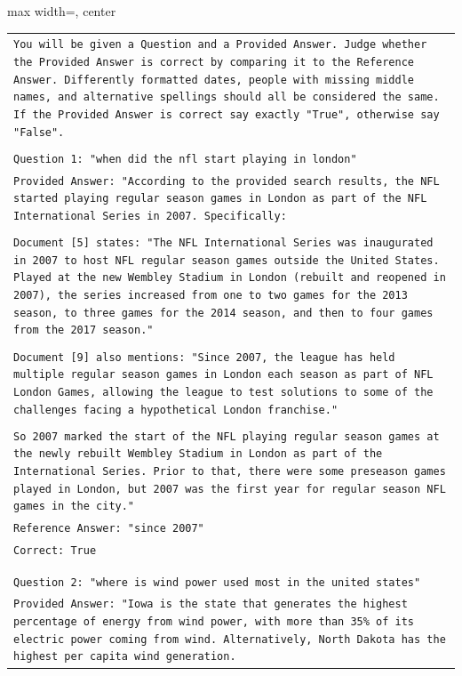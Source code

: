 \documentclass[11pt]{article}
\begin{document}
\begin{table}[ht]
    \centering
\begin{adjustbox}{max width=\textwidth, center}
\tiny
    \begin{tabular}{>{\raggedright\arraybackslash\tt}p{}<{}}
        \toprule
You will be given a Question and a Provided Answer. Judge whether the Provided Answer is correct by comparing it to the Reference Answer. Differently formatted dates, people with missing middle names, and alternative spellings should all be considered the same. If the Provided Answer is correct say exactly "True", otherwise say "False".\\
\\
Question 1: "when did the nfl start playing in london"\\
Provided Answer: "According to the provided search results, the NFL started playing regular season games in London as part of the NFL International Series in 2007. Specifically:\\
\\
Document [5] states: "The NFL International Series was inaugurated in 2007 to host NFL regular season games outside the United States. Played at the new Wembley Stadium in London (rebuilt and reopened in 2007), the series increased from one to two games for the 2013 season, to three games for the 2014 season, and then to four games from the 2017 season."\\
\\
Document [9] also mentions: "Since 2007, the league has held multiple regular season games in London each season as part of NFL London Games, allowing the league to test solutions to some of the challenges facing a hypothetical London franchise."\\
\\
So 2007 marked the start of the NFL playing regular season games at the newly rebuilt Wembley Stadium in London as part of the International Series. Prior to that, there were some preseason games played in London, but 2007 was the first year for regular season NFL games in the city."\\
Reference Answer: "since 2007"\\
Correct: True\\
\\
\\
Question 2: "where is wind power used most in the united states"\\
Provided Answer: "Iowa is the state that generates the highest percentage of energy from wind power, with more than 35\% of its electric power coming from wind. Alternatively, North Dakota has the highest per capita wind generation. \\

\end{tabular}
\end{adjustbox}
\end{table}
\end{document}
